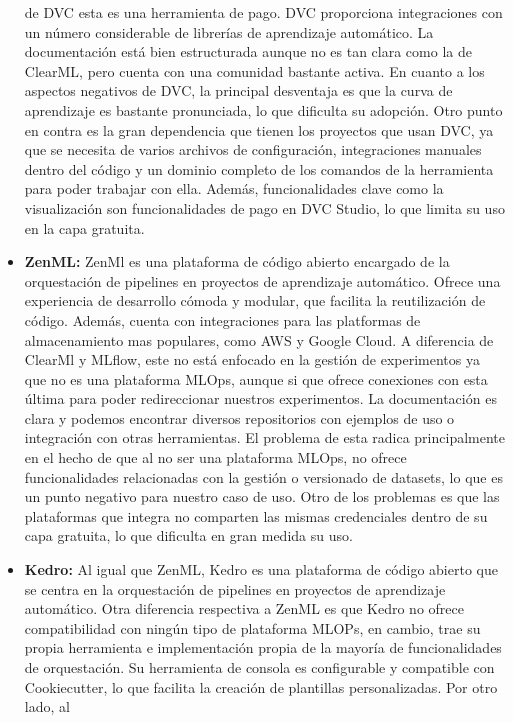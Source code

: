 \begin{itemize}
    de DVC esta es una herramienta de pago. DVC proporciona integraciones con un número considerable de librerías de 
    aprendizaje automático. La documentación está bien estructurada aunque no es tan clara como la de ClearML, pero cuenta con una
    comunidad bastante activa. En cuanto a los aspectos negativos de DVC, la principal desventaja es que
    la curva de aprendizaje es bastante pronunciada, lo que dificulta su adopción. Otro punto en contra
    es la gran dependencia que tienen los proyectos que usan DVC, ya que se necesita de varios archivos
    de configuración, integraciones manuales dentro del código y un dominio completo de los comandos de la
    herramienta para poder trabajar con ella. Además, funcionalidades clave como la visualización son funcionalidades
    de pago en DVC Studio, lo que limita su uso en la capa gratuita.
    \item \textbf{ZenML:} ZenMl es una plataforma de código abierto encargado de la orquestación de pipelines en
    proyectos de aprendizaje automático. Ofrece una experiencia de desarrollo cómoda y modular, que facilita
    la reutilización de código. Además, cuenta con integraciones para las platformas de almacenamiento
    mas populares, como AWS y Google Cloud. A diferencia de ClearMl y MLflow, este no está enfocado en la
    gestión de experimentos ya que no es una plataforma MLOps, aunque si que ofrece conexiones con esta última
    para poder redireccionar nuestros experimentos. La documentación es clara y podemos encontrar diversos repositorios 
    con ejemplos de uso o integración con otras herramientas. El problema de esta radica principalmente
    en el hecho de que al no ser una plataforma MLOps, no ofrece funcionalidades relacionadas con la gestión
    o versionado de datasets, lo que es un punto negativo para nuestro caso de uso. Otro de los problemas
    es que las plataformas que integra no comparten las mismas credenciales dentro de su capa
    gratuita, lo que dificulta en gran medida su uso. 
    \item \textbf{Kedro:} Al igual que ZenML, Kedro es una plataforma de código abierto que se centra en la
    orquestación de pipelines en proyectos de aprendizaje automático. Otra diferencia respectiva a ZenML es
    que Kedro no ofrece compatibilidad con ningún tipo de plataforma MLOPs, en cambio, trae su propia herramienta
    e implementación propia de la mayoría de funcionalidades de orquestación. Su herramienta de consola es configurable 
    y compatible con Cookiecutter, lo que facilita la creación de plantillas personalizadas. Por otro lado, al

\end{itemize}
